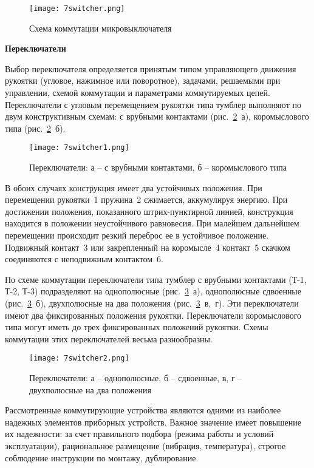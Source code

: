 \begin{figure}[h!]
	\caption{ Схема коммутации микровыключателя }
	\texttt{[image: 7switcher.png]}
	\label{pic:7switcher}
\end{figure}

\begin{flushleft}
\textbf{Переключатели}
\end{flushleft}

Выбор переключателя определяется принятым типом управляющего движения рукоятки (угловое, нажимное или поворотное), задачами, решаемыми при управлении, схемой коммутации и параметрами коммутируемых цепей. Переключатели с угловым перемещением рукоятки типа тумблер выполняют по двум конструктивным схемам: с врубными контактами (рис.~\ref{pic:7switcher1}~а), коромыслового типа (рис.~\ref{pic:7switcher1}~б). 

\begin{figure}[h!]
	\caption{ Переключатели: а -- с врубными контактами, б -- коромыслового типа }
	\texttt{[image: 7switcher1.png]}
	\label{pic:7switcher1}
\end{figure}

В обоих случаях конструкция имеет два устойчивых положения. При перемещении рукоятки~1 пружина~2 сжимается, аккумулируя энергию. При достижении положения, показанного штрих-пунктирной линией, конструкция находится в положении неустойчивого равновесия. При малейшем дальнейшем перемещении происходит резкий переброс ее в устойчивое положение. Подвижный контакт~3 или закрепленный на коромысле~4 контакт~5 скачком соединяются с неподвижным контактом~6.

По схеме коммутации переключатели типа тумблер с врубными контактами (Т-1, Т-2, Т-3) подразделяют на однополюсные (рис.~\ref{pic:7switcher2}~а), однополюсные сдвоенные (рис.~\ref{pic:7switcher2}~б), двухполюсные на два положения (рис.~\ref{pic:7switcher2}~в,~г). Эти переключатели имеют два фиксированных положения рукоятки. Переключатели коромыслового типа могут иметь до трех фиксированных положений рукоятки. Схемы коммутации этих переключателей весьма разнообразны.

\begin{figure}[h!]
	\caption{ Переключатели: а -- однополюсные, б -- сдвоенные, в, г --  двухполюсные на два положения}
	\texttt{[image: 7switcher2.png]}
	\label{pic:7switcher2}
\end{figure}

Рассмотренные коммутирующие устройства являются одними из наиболее надежных элементов приборных устройств. Важное значение имеет повышение их надежности: за счет правильного подбора (режима работы и условий эксплуатации), рациональное размещение (вибрация, температура), строгое соблюдение инструкции по монтажу, дублирование.
